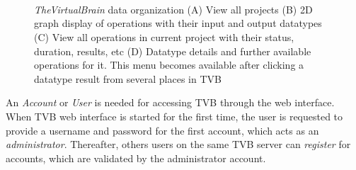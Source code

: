 \documentclass{bioinfo}
\newcommand{\TVB}{\textit{TheVirtualBrain }}
\begin{document}
 \begin{figure}[!htbp]

		\centering
		\\
		\\
		\\
		\caption{\TVB data organization
		(A) View all projects
		(B) 2D graph display of operations with their input and output datatypes 
		(C) View all operations in current project with their status, duration, results, etc
		(D) Datatype details and further available operations for it. This menu becomes available after clicking a datatype result from several places in TVB }
				\label{fig:project}
\end{figure}

		An \emph{Account} or \emph{User} is needed for accessing TVB through
		the web interface.  When TVB web interface is started for the first
		time, the user is requested to provide a username and 
		password for the first account, which acts as an \emph{administrator}.
        Thereafter, others users on the same TVB server can \emph{register}
		for accounts, which are validated by the administrator account.
\end{document}
